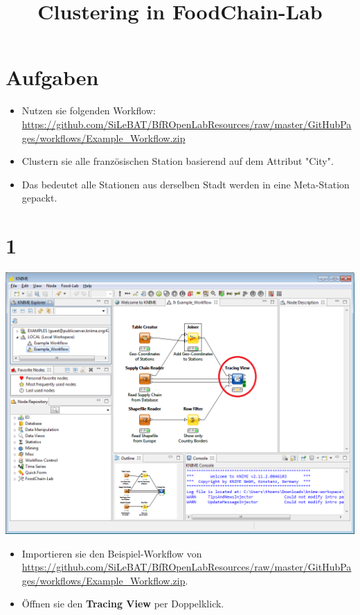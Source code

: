 \documentclass{beamer}
\title{Clustering in FoodChain-Lab}
\date{}
\begin{document}
\maketitle

\section{Aufgaben}
\begin{frame}
	\begin{itemize}
		\item Nutzen sie folgenden Workflow: \url{https://github.com/SiLeBAT/BfROpenLabResources/raw/master/GitHubPages/workflows/Example_Workflow.zip}
		\item Clustern sie alle französischen Station basierend auf dem Attribut "City".
		\item Das bedeutet alle Stationen aus derselben Stadt werden in eine Meta-Station gepackt.
	\end{itemize}
\end{frame}
 
\section{1}
\begin{frame}
	\begin{center}
  		\includegraphics[height=0.6\textheight]{1.png}
	\end{center}
	\begin{itemize}
		\item Importieren sie den Beispiel-Workflow von \url{https://github.com/SiLeBAT/BfROpenLabResources/raw/master/GitHubPages/workflows/Example_Workflow.zip}.
		\item Öffnen sie den \textbf{Tracing View} per Doppelklick.
	\end{itemize}
\end{frame}
\end{document}
